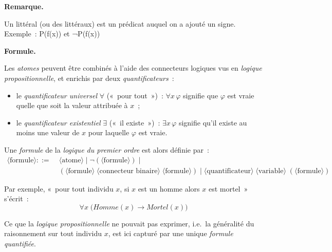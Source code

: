 \documentclass[11pt]{article}
\newenvironment{paraph}[1]{%
  \medskip
  \noindent\textbf{#1.}\quad

  \vspace{0.2cm}
}{%
  \medskip
}
\newenvironment{remarque}{%
    \begin{mdframed}[
        linecolor=sectioncolor!40,
        linewidth=0.8pt,
        backgroundcolor=sectioncolor!5,
        innerleftmargin=10pt,
        innerrightmargin=10pt,
        innertopmargin=6pt,
        innerbottommargin=6pt,
        skipabove=8pt,
        skipbelow=8pt
    ]
    \noindent\textbf{\small\color{sectioncolor}Remarque.}\enspace\small\itshape
}{%
    \end{mdframed}
}
\begin{document}
\begin{remarque}
    Un littéral (ou des littéraux) est un prédicat auquel on a ajouté un signe.\\
    Exemple~: P(f(x)) et ¬P(f(x))
\end{remarque}

\begin{paraph}{Formule}
Les \textit{atomes} peuvent être combinés à l'aide des connecteurs 
logiques vus en \textit{logique propositionnelle}, et enrichis par 
deux \textit{quantificateurs}~:
\begin{itemize}
    \item le \textit{quantificateur universel} $\forall$ («~pour tout~»)~:
    $\forall x\, \varphi$ signifie que $\varphi$ est vraie quelle que soit 
    la valeur attribuée à $x$~;
    \item le \textit{quantificateur existentiel} $\exists$ («~il existe~»)~: 
    $\exists x\, \varphi$ signifie qu'il existe au moins une valeur de $x$ 
    pour laquelle $\varphi$ est vraie.
\end{itemize}

\vspace{0.2cm}
Une \textit{formule} de la \textit{logique du premier ordre} est alors définie par~:
\[
\begin{aligned}
\langle\text{formule}\rangle ::= \; 
&\langle\text{atome}\rangle \mid
\neg(\langle\text{formule}\rangle) \mid \\
&(\langle\text{formule}\rangle\;\langle\text{connecteur binaire}\rangle\;\langle\text{formule}\rangle) \mid
\langle\text{quantificateur}\rangle\;\langle\text{variable}\rangle\;(\langle\text{formule}\rangle)
\end{aligned}
\]

\vspace{0.2cm}
Par exemple, «~pour tout individu $x$, si $x$ est un homme alors $x$ est mortel~» 
s'écrit~:
\[\forall x\; \bigl(\mathit{Homme}(x) \rightarrow \mathit{Mortel}(x)\bigr)\]
\end{paraph}

\vspace{0.2cm}
Ce que la \textit{logique propositionnelle} ne pouvait pas 
exprimer, i.e.~la généralité du raisonnement sur tout individu $x$, 
est ici capturé par une unique \textit{formule quantifiée}.
\end{document}
